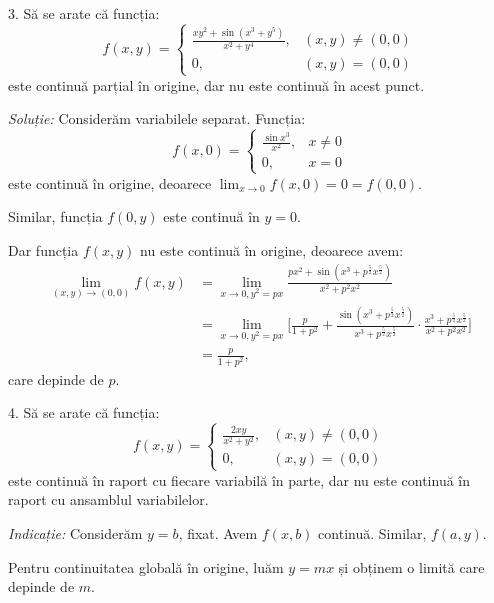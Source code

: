 \documentclass[11pt,a4paper]{article}
\newcommand\ds{\displaystyle}
\theoremstyle{dotless}
\theoremstyle{dotlessdr}
\begin{document}
\vspace{1cm}

3. Să se arate că funcția:
\[
  f(x, y) = \begin{cases}
    \frac{xy^2 + \sin(x^3 + y^5)}{x^2 + y^4}, & (x, y) \neq (0, 0) \\
    0, & (x, y) = (0, 0)
  \end{cases}
\]
este continuă parțial în origine, dar nu este continuă în acest punct.

\emph{Soluție:} Considerăm variabilele separat. Funcția:
\[
  f(x, 0) = \begin{cases}
    \frac{\sin x^3}{x^2}, & x \neq 0 \\
    0, & x = 0
  \end{cases}
\]
este continuă în origine, deoarece $\ds\lim_{x \to 0} f(x, 0) = 0 = f(0, 0)$.

Similar, funcția $f(0, y)$ este continuă în $y = 0$.

Dar funcția $f(x, y)$ nu este continuă în origine, deoarece avem:
\begin{align*}
  \lim_{(x, y) \to (0, 0)} f(x, y) &= \lim_{x \to 0, y^2 = px} \frac{px^2 + \sin(x^3 + p^\frac{5}{2} x^{\frac{5}{2}})}{x^2 + p^2 x^2} \\
                                   &= \lim_{x \to 0, y^2 = px} \Bigg[ \frac{p}{1 + p^2} + %
                                     \frac{\sin(x^3 + p^{\frac{5}{2}} x^{\frac{5}{2}})}{x^3 + p^{\frac{5}{2}} x^{\frac{5}{2}}} \cdot %
                                     \frac{x^3 + p^{\frac{5}{2}} x^{\frac{5}{2}}}{x^2 + p^2 x^2} \Bigg] \\
                                   &= \frac{p}{1 + p^2},
\end{align*}
care depinde de $p$.

\vspace{1cm}

4. Să se arate că funcția:
\[
  f(x, y) = \begin{cases}
    \frac{2xy}{x^2 + y^2}, & (x, y) \neq (0, 0) \\
    0, & (x, y) = (0, 0)
  \end{cases}
\]
este continuă în raport cu fiecare variabilă în parte, dar nu este continuă în raport
cu ansamblul variabilelor.

\emph{Indicație:} Considerăm $y = b$, fixat. Avem $f(x, b)$ continuă. Similar, $f(a, y)$.

Pentru continuitatea globală în origine, luăm $y = mx$ și obținem o limită care depinde de $m$.
\end{document}
